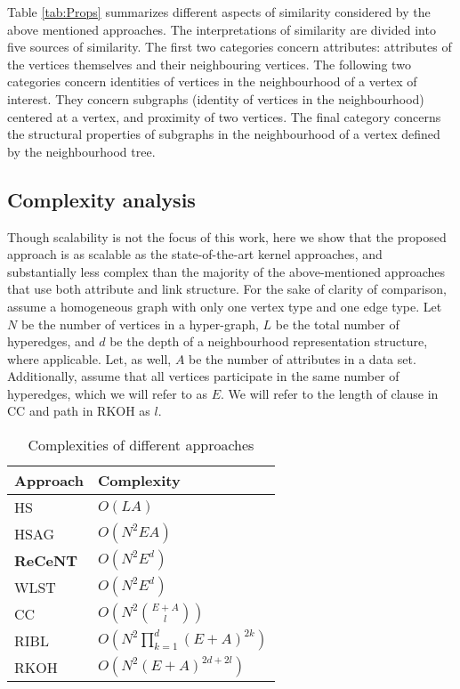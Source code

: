 Table \ref{tab:Props} summarizes different aspects of similarity considered by the above mentioned approaches.
The interpretations of similarity are divided into five sources of similarity.
The first two categories concern attributes: attributes of the vertices themselves and their neighbouring vertices.
The following two categories concern identities of vertices in the neighbourhood of a vertex of interest.
They concern subgraphs (identity of vertices in the neighbourhood) centered at a vertex, and proximity of two vertices.
The final category concerns the structural properties of subgraphs in the neighbourhood of a vertex defined by the neighbourhood tree.


\subsection{Complexity analysis}

Though scalability is not the focus of this work, here we show that the proposed approach is as scalable as the state-of-the-art kernel approaches, and substantially less complex than the majority of the above-mentioned approaches that use both attribute and link structure.
For the sake of clarity of comparison, assume a homogeneous graph with only one vertex type and one edge type.
Let $N$ be the number of vertices in a hyper-graph, $L$ be the total number of hyperedges, and $d$ be the depth of a neighbourhood representation structure, where applicable.
Let, as well, $A$ be the number of attributes in a data set.
Additionally, assume that all vertices participate in the same number of hyperedges, which we will refer to as $E$.
We will refer to the length of clause in CC and path in RKOH as $l$.



\begin{table}
    \centering
    \caption{Complexities of different approaches}
    \label{tab:complexities}
    \begin{tabular}{@{}ll@{}}
        \toprule
        \textbf{Approach} & \textbf{Complexity} \\
        \midrule
        HS    & $O\left (  LA \right )$       \\

         HSAG  & $O \left ( N^2EA \right)$     \\

        \textbf{ReCeNT}  & $O \left ( N^2  E^d  \right )$ \\

         WLST  & $O \left( N^2 E^d \right ) $  \\

        CC    & $O \left( N^2   {{E + A}\choose{l}} \right)$  \\

        RIBL  & $O \left(  N^2 \prod_{k=1}^{d}(E + A)^{2k} \right) $  \\

         RKOH  & $O \left(  N^2 \left( E + A \right)^{2d + 2l} \right)$ \\
        \bottomrule
    \end{tabular}

\end{table}




